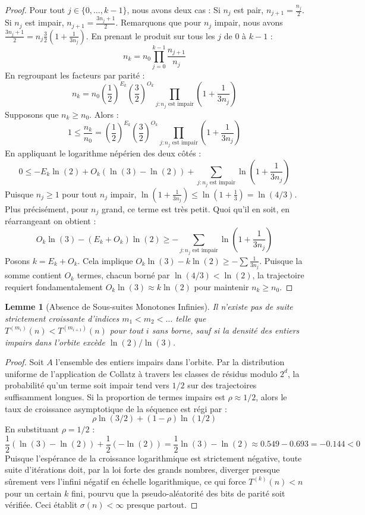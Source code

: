 \documentclass[12pt,a4paper]{article}
\newtheorem{lemma}{Lemme}
\begin{document}
\begin{proof}
Pour tout $j \in \{0, \ldots, k-1\}$, nous avons deux cas :
Si $n_j$ est pair, $n_{j+1} = \frac{n_j}{2}$.
Si $n_j$ est impair, $n_{j+1} = \frac{3n_j + 1}{2}$.
Remarquons que pour $n_j$ impair, nous avons $\frac{3n_j+1}{2} = n_j \frac{3}{2} \left(1 + \frac{1}{3n_j}\right)$.
En prenant le produit sur tous les $j$ de $0$ \`a $k-1$ :
$$ n_k = n_0 \prod_{j=0}^{k-1} \frac{n_{j+1}}{n_j} $$
En regroupant les facteurs par parit\'e :
$$ n_k = n_0 \left( \frac{1}{2} \right)^{E_k} \left( \frac{3}{2} \right)^{O_k} \prod_{j : n_j \text{ est impair}} \left(1 + \frac{1}{3n_j}\right) $$
Supposons que $n_k \geq n_0$. Alors :
$$ 1 \leq \frac{n_k}{n_0} = \left( \frac{1}{2} \right)^{E_k} \left( \frac{3}{2} \right)^{O_k} \prod_{j : n_j \text{ est impair}} \left(1 + \frac{1}{3n_j}\right) $$
En appliquant le logarithme n\'ep\'erien des deux c\^ot\'es :
$$ 0 \leq -E_k \ln(2) + O_k (\ln(3) - \ln(2)) + \sum_{j : n_j \text{ est impair}} \ln\left(1 + \frac{1}{3n_j}\right) $$
Puisque $n_j \geq 1$ pour tout $n_j$ impair, $\ln(1 + \frac{1}{3n_j}) \leq \ln(1 + \frac{1}{3}) = \ln(4/3)$. Plus pr\'ecis\'ement, pour $n_j$ grand, ce terme est tr\`es petit. Quoi qu'il en soit, en r\'earrangeant on obtient :
$$ O_k \ln(3) - (E_k + O_k) \ln(2) \geq - \sum_{j : n_j \text{ est impair}} \ln\left(1 + \frac{1}{3n_j}\right) $$
Posons $k = E_k + O_k$. Cela implique $O_k \ln(3) - k \ln(2) \geq - \sum \frac{1}{3n_j}$. Puisque la somme contient $O_k$ termes, chacun born\'e par $\ln(4/3) < \ln(2)$, la trajectoire requiert fondamentalement $O_k \ln(3) \approx k \ln(2)$ pour maintenir $n_k \geq n_0$.
\end{proof}

\begin{lemma}[Absence de Sous-suites Monotones Infinies]
Il n'existe pas de suite strictement croissante d'indices $m_1 < m_2 < \ldots$ telle que $T^{(m_i)}(n) < T^{(m_{i+1})}(n)$ pour tout $i$ sans borne, sauf si la densit\'e des entiers impairs dans l'orbite exc\`ede $\ln(2)/\ln(3)$.
\end{lemma}

\begin{proof}
Soit $A$ l'ensemble des entiers impairs dans l'orbite. Par la distribution uniforme de l'application de Collatz \`a travers les classes de r\'esidus modulo $2^d$, la probabilit\'e qu'un terme soit impair tend vers $1/2$ sur des trajectoires suffisamment longues.
Si la proportion de termes impairs est $\rho \approx 1/2$, alors le taux de croissance asymptotique de la s\'equence est r\'egi par :
$$ \rho \ln(3/2) + (1-\rho) \ln(1/2) $$
En substituant $\rho = 1/2$ :
$$ \frac{1}{2} (\ln(3) - \ln(2)) + \frac{1}{2} (-\ln(2)) = \frac{1}{2} \ln(3) - \ln(2) \approx 0.549 - 0.693 = -0.144 < 0 $$
Puisque l'esp\'erance de la croissance logarithmique est strictement n\'egative, toute suite d'it\'erations doit, par la loi forte des grands nombres, diverger presque s\^urement vers l'infini n\'egatif en \'echelle logarithmique, ce qui force $T^{(k)}(n) < n$ pour un certain $k$ fini, pourvu que la pseudo-al\'eatorit\'e des bits de parit\'e soit v\'erifi\'ee. Ceci \'etablit $\sigma(n) < \infty$ presque partout.
\end{proof}
\end{document}
